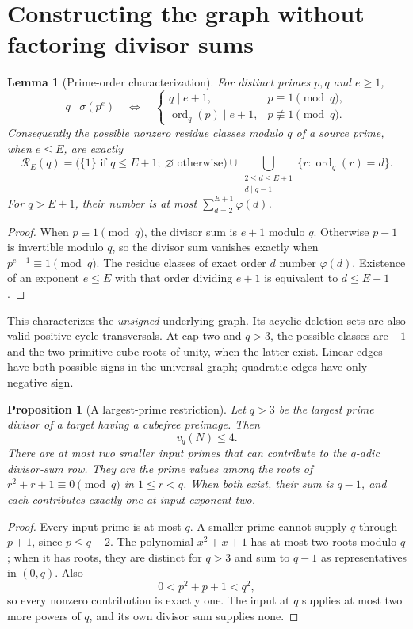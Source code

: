 \documentclass[11pt]{article}
\newtheorem{lemma}[theorem]{Lemma}
\newtheorem{proposition}[theorem]{Proposition}
\DeclareMathOperator{\ord}{ord}
\begin{document}
\section{Constructing the graph without factoring divisor sums}
\begin{lemma}[Prime-order characterization]\label{lem:orders}
For distinct primes $p,q$ and $e\ge1$,
\[
 q\mid\sigma(p^e)
 \quad\Longleftrightarrow\quad
 \begin{cases}
 q\mid e+1,&p\equiv1\pmod q,\\
 \ord_q(p)\mid e+1,&p\not\equiv1\pmod q.
 \end{cases}
\]
Consequently the possible nonzero residue classes modulo $q$ of a source prime, when $e\le E$, are exactly
\[
 \mathcal R_E(q)=
 \bigl(\{1\}\text{ if }q\le E+1;\ \varnothing\text{ otherwise}\bigr)
 \cup\bigcup_{\substack{2\le d\le E+1\\d\mid q-1}}
 \{r:\ord_q(r)=d\}.
\]
For $q>E+1$, their number is at most $\sum_{d=2}^{E+1}\varphi(d)$.
\end{lemma}
\begin{proof}
When $p\equiv1\pmod q$, the divisor sum is $e+1$ modulo $q$. Otherwise $p-1$ is invertible modulo $q$, so the divisor sum vanishes exactly when $p^{e+1}\equiv1\pmod q$. The residue classes of exact order $d$ number $\varphi(d)$. Existence of an exponent $e\le E$ with that order dividing $e+1$ is equivalent to $d\le E+1$.
\end{proof}

This characterizes the \emph{unsigned} underlying graph. Its acyclic deletion sets are also valid positive-cycle transversals. At cap two and $q>3$, the possible classes are $-1$ and the two primitive cube roots of unity, when the latter exist. Linear edges have both possible signs in the universal graph; quadratic edges have only negative sign.

\begin{proposition}[A largest-prime restriction]\label{prop:largest}
Let $q>3$ be the largest prime divisor of a target having a cubefree preimage. Then
\[
 \boxed{v_q(N)\le4.}
\]
There are at most two smaller input primes that can contribute to the $q$-adic divisor-sum row. They are the prime values among the roots of $r^2+r+1\equiv0\pmod q$ in $1\le r<q$. When both exist, their sum is $q-1$, and each contributes exactly one at input exponent two.
\end{proposition}
\begin{proof}
Every input prime is at most $q$. A smaller prime cannot supply $q$ through $p+1$, since $p\le q-2$. The polynomial $x^2+x+1$ has at most two roots modulo $q$; when it has roots, they are distinct for $q>3$ and sum to $q-1$ as representatives in $(0,q)$. Also
\[
 0<p^2+p+1<q^2,
\]
so every nonzero contribution is exactly one. The input at $q$ supplies at most two more powers of $q$, and its own divisor sum supplies none.
\end{proof}
\end{document}
